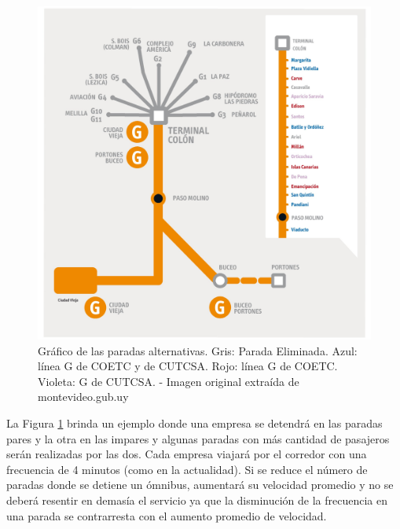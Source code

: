 \begin{figure}[H]
	\centering
	\includegraphics[width=0.9\linewidth]{Figures/paradas_alternativas}
	\caption[Gráfico de las paradas alternativas.]{Gráfico de las paradas alternativas. Gris: Parada Eliminada. Azul: línea G de COETC y de CUTCSA. Rojo: línea G de COETC. Violeta: G de CUTCSA. - Imagen original extraída de montevideo.gub.uy}
	\label{fig:paradas_alternadas}
\end{figure}

La Figura \ref{fig:paradas_alternadas} brinda un ejemplo donde una empresa se detendrá en las paradas pares y la otra en las impares y algunas paradas con más cantidad de pasajeros serán realizadas por las dos. Cada empresa viajará por el corredor con una frecuencia de 4 minutos (como en la actualidad). Si se reduce el número de paradas donde se detiene un ómnibus, aumentará su velocidad promedio y no se deberá resentir en demasía el servicio ya que la disminución de la frecuencia en una parada se contrarresta con el aumento promedio de velocidad.



